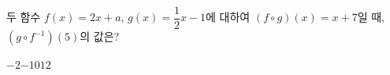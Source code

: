 \hspace*{2mm}\begin{minipage}[t]{\dimexpr\linewidth-2mm\relax}\vspace{0pt}
두 함수 $f(x)=2x+a$, $g(x)=\dfrac{1}{2}x-1$에 대하여 $(f\circ g)(x)=x+7$일 때, $(g\circ f^{-1})(5)$의 값은? 
\begin{choices32}{$-2$}{$-1$}{$0$}{$1$}{$2$}\end{choices32}\end{minipage}

